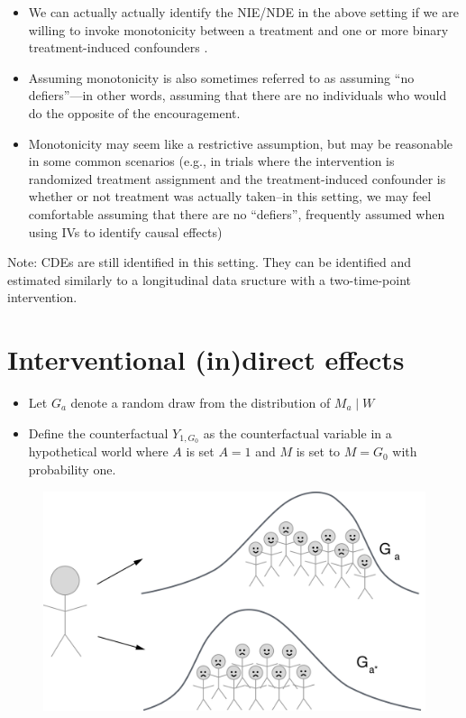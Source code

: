 \documentclass[
  12pt,
]{book}
\providecommand{\tightlist}{%
  \setlength{\itemsep}{0pt}\setlength{\parskip}{0pt}}
\theoremstyle{definition}
\theoremstyle{definition}
\theoremstyle{definition}
\newcommand{\1}{\mathbbm{1}}
\begin{document}
\begin{itemize}
\tightlist
\item
  We can actually actually identify the NIE/NDE in the above setting if we are
  willing to invoke monotonicity between a treatment and one or more binary
  treatment-induced confounders \citep{tchetgen2014identification}.
\item
  Assuming monotonicity is also sometimes referred to as assuming ``no
  defiers''---in other words, assuming that there are no individuals who would
  do the opposite of the encouragement.
\item
  Monotonicity may seem like a restrictive assumption, but may be reasonable in
  some common scenarios (e.g., in trials where the intervention is randomized
  treatment assignment and the treatment-induced confounder is whether or not
  treatment was actually taken--in this setting, we may feel comfortable
  assuming that there are no ``defiers'', frequently assumed when using IVs to
  identify causal effects)
\end{itemize}

Note: CDEs are still identified in this setting. They can be identified and
estimated similarly to a longitudinal data sructure with a two-time-point
intervention.

\hypertarget{interventional-indirect-effects}{%
\section{Interventional (in)direct effects}\label{interventional-indirect-effects}}

\begin{itemize}
\tightlist
\item
  Let \(G_a\) denote a random draw from the distribution of \(M_a \mid W\)
\item
  Define the counterfactual \(Y_{1,G_0}\) as the counterfactual
  variable in a hypothetical world where \(A\) is set \(A=1\) and \(M\) is
  set to \(M=G_0\) with probability one.
\end{itemize}

\begin{figure}

{\centering \includegraphics[width=0.5\linewidth]{img/graphic4b} 

}

\end{figure}
\end{document}
